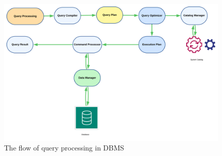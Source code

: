 \begin{figure}[H]
    \centering
    
    \includegraphics[width=1\textwidth]{Figure/Flow of query processing.png}
    \caption[The flow of query processing in DBMS]{The flow of query processing in DBMS ~\cite{wwwnaukricom-no-date} }
     
    \label{fig:my_image} 
\end{figure}
